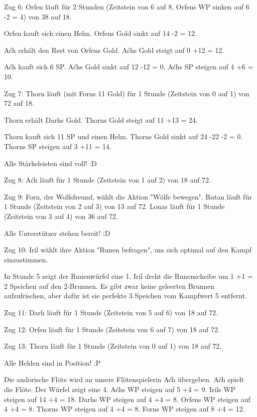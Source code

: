 \documentclass[10pt, a4paper, oneside]{book}
\begin{document}
{Zug 6: Orfen läuft für 2 Stunden (Zeitstein von 6 auf 8, Orfens WP sinken auf 6 -2 = 4) von 38 auf 18.

Orfen kauft sich einen Helm. Orfens Gold sinkt auf 14 -2 = 12.

Aćh erhält den Rest von Orfens Gold. Aćhs Gold steigt auf 0 +12 = 12.

Aćh kauft sich 6 SP. Aćhs Gold sinkt auf 12 -12 = 0. Aćhs SP steigen auf 4 +6 = 10.



Zug 7: Thorn läuft (mit Forns 11 Gold) für 1 Stunde (Zeitstein von 0 auf 1) von 72 auf 18.

Thorn erhält Darhs Gold. Thorns Gold steigt auf 11 +13 = 24.

Thorn kauft sich 11 SP und einen Helm. Thorns Gold sinkt auf 24 -22 -2 = 0. Thorns SP steigen auf 3 +11 = 14.

Alle Stärkeleisten sind voll! :D



Zug 8: Aćh läuft für 1 Stunde (Zeitstein von 1 auf 2) von 18 auf 72.



Zug 9: Forn, der Wolfsfreund, wählt die Aktion "Wölfe bewegen". Rutan läuft für 1 Stunde (Zeitstein von 2 auf 3) von 13 auf 72. Lonas läuft für 1 Stunde (Zeitstein von 3 auf 4) von 36 auf 72.

Alle Unterstützer stehen bereit! :D



Zug 10: Iril wählt ihre Aktion "Runen befragen", um sich optimal auf den Kampf einzustimmen.

In Stunde 5 zeigt der Runenwürfel eine 1. Iril dreht die Runenscheibe um 1 +1 = 2 Speichen auf den 2-Brunnen. Es gibt zwar keine geleerten Brunnen aufzufrischen, aber dafür ist sie perfekte 3 Speichen vom Kampfwert 5 entfernt.



Zug 11: Darh läuft für 1 Stunde (Zeitstein von 5 auf 6) von 18 auf 72.



Zug 12: Orfen läuft für 1 Stunde (Zeitstein von 6 auf 7) von 18 auf 72.



Zug 13: Thorn läuft für 1 Stunde (Zeitstein von 0 auf 1) von 18 auf 72.

Alle Helden sind in Position! :P



Die andorische Flöte wird an unsere Flötenspielerin Aćh übergeben. Aćh spielt die Flöte. Der Würfel zeigt eine 4. Aćhs WP steigen auf 5 +4 = 9. Irils WP steigen auf 14 +4 = 18. Darhs WP steigen auf 4 +4 = 8. Orfens WP steigen auf 4 +4 = 8. Thorns WP steigen auf 4 +4 = 8. Forns WP steigen auf 8 +4 = 12.

}
\end{document}
